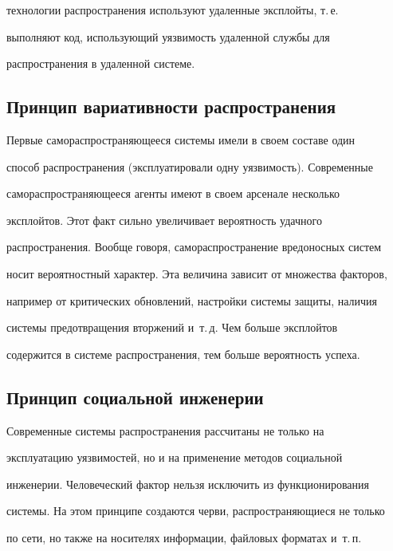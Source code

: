 технологии распространения используют удаленные эксплойты, т.\,е.\ 


выполняют код, использующий уязвимость удаленной службы для 


распространения в удаленной системе.





\subsection{Принцип вариативности распространения} %


     


     Первые самораспространяющееся системы имели в своем составе один 


способ распространения (эксплуатировали одну уязвимость). Современные 


самораспространяющееся агенты имеют в своем арсенале несколько 


эксплойтов. Этот факт сильно увеличивает вероятность удачного 


распространения. Вообще говоря, самораспространение вредоносных систем 


носит вероятностный характер. Эта величина зависит от множества факторов, 


например от критических обновлений, настройки системы защиты, наличия 


системы предотвращения вторжений и~т.\,д. Чем больше эксплойтов 


содержится в системе распространения, тем больше вероятность успеха.





\subsection{Принцип социальной инженерии} %


     


     Современные системы распространения рассчитаны не только на 


эксплуатацию уязвимостей, но и на применение методов социальной 


инженерии. Человеческий фактор нельзя исключить из функционирования 


системы. На этом принципе создаются черви, распространяющиеся не только 


по сети, но также на носителях информации, файловых форматах и~т.\,п. 



